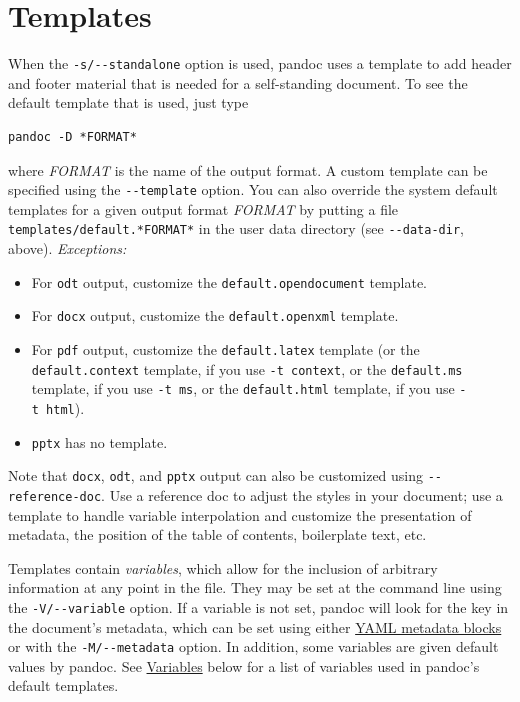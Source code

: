 \documentclass[
  b5paper
]{book}
\providecommand{\tightlist}{%
  \setlength{\itemsep}{0pt}\setlength{\parskip}{0pt}}
\begin{document}
\chapter{Templates}\label{templates}

When the \texttt{-s/-\/-standalone} option is used, pandoc uses a
template to add header and footer material that is needed for a
self-standing document. To see the default template that is used, just
type

\begin{verbatim}
pandoc -D *FORMAT*
\end{verbatim}

where \emph{FORMAT} is the name of the output format. A custom template
can be specified using the \texttt{-\/-template} option. You can also
override the system default templates for a given output format
\emph{FORMAT} by putting a file \texttt{templates/default.*FORMAT*} in
the user data directory (see \texttt{-\/-data-dir}, above).
\emph{Exceptions:}

\begin{itemize}
\tightlist
\item
  For \texttt{odt} output, customize the \texttt{default.opendocument}
  template.
\item
  For \texttt{docx} output, customize the \texttt{default.openxml}
  template.
\item
  For \texttt{pdf} output, customize the \texttt{default.latex} template
  (or the \texttt{default.context} template, if you use
  \texttt{-t\ context}, or the \texttt{default.ms} template, if you use
  \texttt{-t\ ms}, or the \texttt{default.html} template, if you use
  \texttt{-t\ html}).
\item
  \texttt{pptx} has no template.
\end{itemize}

Note that \texttt{docx}, \texttt{odt}, and \texttt{pptx} output can also
be customized using \texttt{-\/-reference-doc}. Use a reference doc to
adjust the styles in your document; use a template to handle variable
interpolation and customize the presentation of metadata, the position
of the table of contents, boilerplate text, etc.

Templates contain \emph{variables}, which allow for the inclusion of
arbitrary information at any point in the file. They may be set at the
command line using the \texttt{-V/-\/-variable} option. If a variable is
not set, pandoc will look for the key in the document's metadata, which
can be set using either \hyperref[extension-yaml_metadata_block]{YAML
metadata blocks} or with the \texttt{-M/-\/-metadata} option. In
addition, some variables are given default values by pandoc. See
\hyperref[variables]{Variables} below for a list of variables used in
pandoc's default templates.
\end{document}
